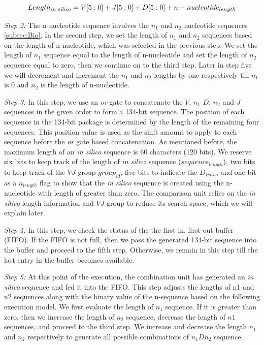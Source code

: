 \begin{equation}\label{eq:4}	
Length_{\emph{in silico}} = V[5:0] + J[5:0] + D[5:0]+ n-nucleotide_{length}
\end{equation} 
 
\emph{Step 2:} The n-nucleotide sequence involves the $n_1$ and $n_2$ nucleotide sequences \ref{subsec:Bio}. In the second step, we set the length of $n_1$ and $n_2$ sequences based on the length of n-nucleotide, which was selected in the previous step.  We set the length of $n_1$ sequence equal to the length of n-nucleotide and set the length of $n_2$ sequence equal to zero, then we continue on to the third step. Later in step five we will decrement and increment the $n_1$ and $n_2$ lengths by one respectively till $n_1$ is 0 and $n_2$ is the length of n-nucleotide. 

\emph{Step 3:} In this step,  we use an \emph{or} gate to concatenate the $V$, $n_1$  $D$,  $n_2$ and $J$ sequences in the given order to form a 134-bit sequence. The position of each sequence in the 134-bit package is determined by the length of the remaining four sequences. This position value is used as the shift amount to apply to each sequence before the \emph{or} gate based concatenation. As mentioned before, the maximum length of an \emph{in silico} sequence is 60 characters (120 bits). We reserve six bits to keep track of the length of \emph{in silico} sequence ($sequence_{length}$), two bits to keep track of the $VJ$ group $group_{id}$, five bits to indicate the $D_{Path}$, and one bit as a $n_{length}$ flag to show that the \emph{in silico} sequence is created using the n-nucleotide with length of greater than zero. The comparison unit relies on the \emph{in silico} length information and $VJ$ group to reduce its search space, which we will explain later.


\emph{Step 4:} In this step, we check the status of the the first-in, first-out buffer (FIFO). If the FIFO is not full, then we pass the generated 134-bit sequence into the buffer and proceed to the fifth step. Otherwise, we remain in this step till the last entry in the buffer becomes available.   

\emph{Step 5:} At this point of the execution, the combination unit has generated an \emph{in silico} sequence and fed it into the FIFO. This step adjusts the lengths of n1 and n2 sequences along with the binary value of the n-sequence based on the following execution model. We first evaluate the length of $n_1$ sequence. If it is greater than zero, then we increase the length of $n_2$ sequence, decrease the length of $n1$ sequences, and proceed to the third step. We increase and decrease the length $n_1$ and $n_2$ respectively to generate all possible combinations of $n_1Dn_2$ sequence. 


